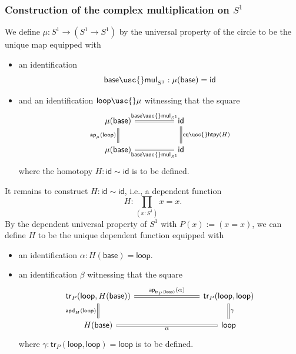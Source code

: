 \documentclass[handout]{beamer}
\newcommand{\sphere}[1]{S^{#1}}
\newcommand{\htpy}{\sim}
\newcommand{\ap}{\mathsf{ap}}
\newcommand{\baseS}{\mathsf{base}}
\newcommand{\loopS}{\mathsf{loop}}
\newcommand{\apd}{\mathsf{apd}}
\newcommand{\tr}{\mathsf{tr}}
\newcommand{\idfunc}{\mathsf{id}}
\newcommand{\mulcircle}{\mu}
\newcommand{\basemulcircle}{\mathsf{base\usc{}mul}_{\sphere{1}}}
\newcommand{\htpyidcircle}{H}
\newcommand{\basehtpyidcircle}{\alpha}
\newcommand{\eqhtpy}{\mathsf{eq\usc{}htpy}}
\newcommand{\apply}[2]{#1(#2)}
\begin{document}
\begin{frame}
  \frametitle{Construction of the complex multiplication on $\sphere{1}$}
  We define $\mu:\sphere{1}\to(\sphere{1}\to\sphere{1})$ by the universal property of the circle to be the unique map equipped with
  \begin{itemize}
  \item an identification
    \begin{equation*}
      \basemulcircle : \apply{\mu}{\baseS} = \idfunc
    \end{equation*}
  \item and an identification $\loopS\usc{}\mu$ witnessing that the square
    \begin{equation*}
      \begin{tikzcd}[column sep=huge,ampersand replacement=\&]
        \apply{\mulcircle}{\baseS} \arrow[r,equals,"\basemulcircle"] \arrow[d,equals,swap,"\apply{\ap_{\mulcircle}}{\loopS}"] \& \idfunc \arrow[d,equals,"\apply{\eqhtpy}{\htpyidcircle}"] \\
        \apply{\mulcircle}{\baseS} \arrow[r,equals,swap,"\basemulcircle"] \& \idfunc
      \end{tikzcd}
    \end{equation*}
    where the homotopy $H:\idfunc\htpy\idfunc$ is to be defined.
  \end{itemize}
\end{frame}

\begin{frame}
  It remains to construct $H:\idfunc\htpy\idfunc$, i.e., a dependent function
  \begin{equation*}
    H:\prod_{(x:\sphere{1})}x=x.
  \end{equation*}
  By the dependent universal property of $\sphere{1}$ with $\apply{P}{x}:=(x=x)$, we can define $H$ to be the unique dependent function equipped with
  \begin{itemize}
  \item an identification $\alpha:\apply{H}{\baseS}=\loopS$.
  \item an identification $\beta$ witnessing that the square
    \begin{equation*}
      \begin{tikzcd}[column sep=8em,ampersand replacement=\&]
        \apply{\tr_{P}}{\loopS,\apply{\htpyidcircle}{\baseS}} \arrow[r,equals,"\apply{\ap_{\apply{\tr_{P}}{\loopS}}}{\basehtpyidcircle}"] \arrow[d,equals,swap,"\apply{\apd_{\htpyidcircle}}{\loopS}"] \& \apply{\tr_{P}}{\loopS,\loopS} \arrow[d,equals,"\gamma"] \\
        \apply{\htpyidcircle}{\baseS} \arrow[r,equals,swap,"\basehtpyidcircle"] \& \loopS
      \end{tikzcd}
    \end{equation*}
    where $\gamma:\apply{\tr_P}{\loopS,\loopS}=\loopS$ is to be defined.
  \end{itemize}
\end{frame}
\end{document}
